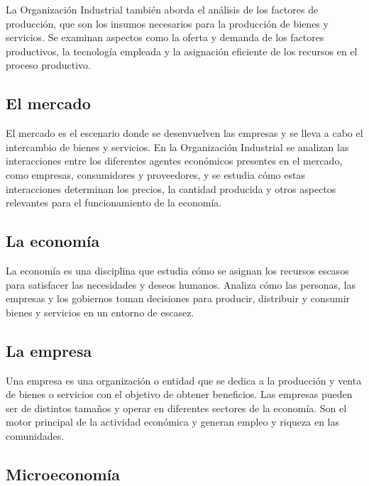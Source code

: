 \documentclass[
  letterpaper,
  DIV=11,
  numbers=noendperiod]{scrartcl}
\begin{document}
La Organización Industrial también aborda el análisis de los factores de
producción, que son los insumos necesarios para la producción de bienes
y servicios. Se examinan aspectos como la oferta y demanda de los
factores productivos, la tecnología empleada y la asignación eficiente
de los recursos en el proceso productivo.

\hypertarget{el-mercado}{%
\subsection{El mercado}\label{el-mercado}}

El mercado es el escenario donde se desenvuelven las empresas y se lleva
a cabo el intercambio de bienes y servicios. En la Organización
Industrial se analizan las interacciones entre los diferentes agentes
económicos presentes en el mercado, como empresas, consumidores y
proveedores, y se estudia cómo estas interacciones determinan los
precios, la cantidad producida y otros aspectos relevantes para el
funcionamiento de la economía.

\hypertarget{la-economuxeda}{%
\subsection{La economía}\label{la-economuxeda}}

La economía es una disciplina que estudia cómo se asignan los recursos
escasos para satisfacer las necesidades y deseos humanos. Analiza cómo
las personas, las empresas y los gobiernos toman decisiones para
producir, distribuir y consumir bienes y servicios en un entorno de
escasez.

\hypertarget{la-empresa}{%
\subsection{La empresa}\label{la-empresa}}

Una empresa es una organización o entidad que se dedica a la producción
y venta de bienes o servicios con el objetivo de obtener beneficios. Las
empresas pueden ser de distintos tamaños y operar en diferentes sectores
de la economía. Son el motor principal de la actividad económica y
generan empleo y riqueza en las comunidades.

\hypertarget{microeconomuxeda}{%
\subsection{Microeconomía}\label{microeconomuxeda}}
\end{document}
